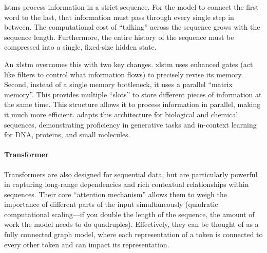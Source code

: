 \glspl{lstm} process information in a strict sequence.  
For the model to connect the first word to the last, that information must pass through every single step in between. 
The computational cost of \enquote{talking} across the sequence grows with the sequence length. 
Furthermore, the entire history of the sequence must be compressed into a single, fixed-size hidden state.

An \gls{xlstm} overcomes this with two key changes. \gls{xlstm} uses enhanced gates (act like filters to control what information flows) to precisely revise its memory. Second, instead of a single memory bottleneck, it uses a parallel \enquote{matrix memory}. This provides multiple \enquote{slots} to store different pieces of information at the same time. This structure allows it to process information in parallel, making it much more efficient.
 adapts this architecture for biological and chemical sequences, demonstrating proficiency in generative tasks and in-context learning for DNA, proteins, and small molecules.\autocite{SchmidingerSSSH25}


\paragraph{Transformer}

Transformers \autocite{vaswani2017attention} are also designed for sequential data, but are particularly powerful in capturing long-range dependencies and rich contextual relationships within sequences. 
Their core \enquote{attention mechanism} allows them to weigh the importance of different parts of the input simultaneously (quadratic computational scaling---if you double the length of the sequence, the amount of work the model needs to do quadruples). 
Effectively, they can be thought of as a fully connected graph model,\autocite{velivckovic2023everything, joshi2025transformers} where each representation of a token is connected to every other token and can impact its representation.

